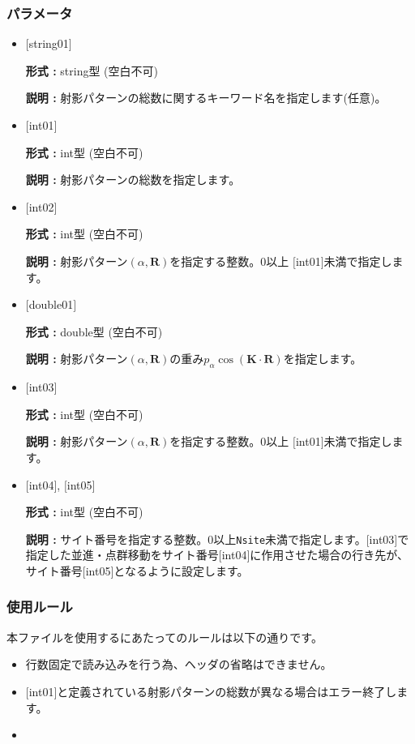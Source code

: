 \subsubsection{パラメータ}
 \begin{itemize}

   \item  $[$string01$]$
   
    {\bf 形式 :} string型 (空白不可)

   {\bf 説明 :} 射影パターンの総数に関するキーワード名を指定します(任意)。

   \item  $[$int01$]$
   
    {\bf 形式 :} int型 (空白不可)

   {\bf 説明 :} 射影パターンの総数を指定します。

  \item  $[$int02$]$
   
 {\bf 形式 :} int型 (空白不可)

{\bf 説明 :} 射影パターン$(\alpha, {\bm R})$を指定する整数。0以上 $[$int01$]${未満}で指定します。
 
  \item  $[$double01$]$
   
 {\bf 形式 :} double型 (空白不可)

{\bf 説明 :} 射影パターン$(\alpha, {\bm R})$の重み$p_{\alpha}\cos ({\bm K}\cdot {\bm R})$を指定します。
 
 \item  $[$int03$]$
   
   {\bf 形式 :} int型 (空白不可)

  {\bf 説明 :} 射影パターン$(\alpha, {\bm R})$を指定する整数。0以上 $[$int01$]${未満}で指定します。

 \item  $[$int04$]$, $[$int05$]$
   
   {\bf 形式 :} int型 (空白不可)

  {\bf 説明 :} サイト番号を指定する整数。0以上\verb|Nsite|{未満}で指定します。$[$int03$]$で指定した並進・点群移動をサイト番号$[$int04$]$に作用させた場合の行き先が、サイト番号$[$int05$]$となるように設定します。

\end{itemize}

\subsubsection{使用ルール}
本ファイルを使用するにあたってのルールは以下の通りです。
\begin{itemize}
\item 行数固定で読み込みを行う為、ヘッダの省略はできません。
\item $[$int01$]$と定義されている射影パターンの総数が異なる場合はエラー終了します。
\item {}
\end{itemize}

